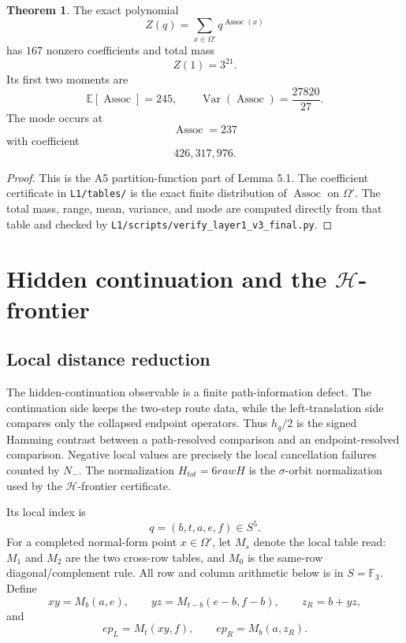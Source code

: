 \documentclass[11pt]{article}
\theoremstyle{definition}
\newtheorem{theorem}{Theorem}[section]
\begin{document}
\begin{theorem}
\label{thm:6.2}
The exact polynomial \[
Z(q)=\sum_{x\in\Omega'}q^{\operatorname{Assoc}(x)}
\] has \(167\) nonzero coefficients and total mass \[
Z(1)=3^{21}.
\] Its first two moments are \[
\mathbb E[\operatorname{Assoc}]=245,
\qquad
\operatorname{Var}(\operatorname{Assoc})=\frac{27820}{27}.
\] The mode occurs at \[
\operatorname{Assoc}=237
\] with coefficient \[
426,317,976.
\]
\end{theorem}

\begin{proof}
This is the A5 partition-function part of Lemma 5.1. The
coefficient certificate in \texttt{L1/tables/} is the exact finite
distribution of \(\operatorname{Assoc}\) on \(\Omega'\).  The total mass,
range, mean, variance, and mode are computed directly from that table and
checked by \texttt{L1/scripts/verify\_layer1\_v3\_final.py}.
\end{proof}

\section{\texorpdfstring{Hidden continuation and the \(\mathcal H\)-frontier}{Hidden continuation and the H-frontier}}\label{hidden-continuation}

\subsection{Local distance reduction}\label{local-distance-reduction}

The hidden-continuation observable is a finite path-information defect.
The continuation side keeps the two-step route data, while the
left-translation side compares only the collapsed endpoint operators.
Thus \(h_q/2\) is the signed Hamming contrast between a path-resolved
comparison and an endpoint-resolved comparison. Negative local values
are precisely the local cancellation failures counted by \(N_-\). The
normalization \(H_{tot}=6rawH\) is the \(\sigma\)-orbit normalization
used by the \(\mathcal H\)-frontier certificate.

Its local index is
\[
q=(b,t,a,e,f)\in S^5.
\]
For a completed normal-form point \(x\in\Omega'\), let \(M_s\) denote
the local table read: \(M_1\) and \(M_2\) are the two cross-row tables,
and \(M_0\) is the same-row diagonal/complement rule. All row and column
arithmetic below is in \(S=\mathbb F_3\). Define
\[
xy=M_b(a,e),
\qquad
yz=M_{t-b}(e-b,f-b),
\qquad
z_R=b+yz,
\]
and
\[
ep_L=M_t(xy,f),
\qquad
ep_R=M_b(a,z_R).
\]
\end{document}
